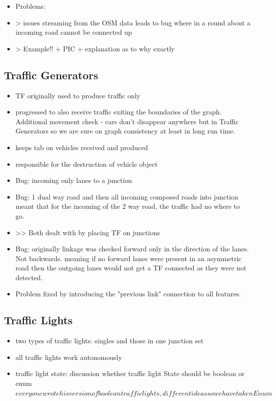 \begin{itemize}
	\item Problems:
	\item > issues streaming from the OSM data leads to bug where in a round about a incoming road cannot be connected up
	\item > Example!! + PIC + explanation as to why exactly
\end{itemize}

\subsection{Traffic Generators}
\begin{itemize}
	\item TF originally used to produce traffic only
	\item progressed to also receive traffic exiting the boundaries of the graph. Additional movement check - cars don't disappear anywhere but in Traffic Generators so we are sure on graph consistency at least in long run time.
	\item keeps tab on vehicles received and produced
	\item responsible for the destruction of vehicle object
	\item Bug: incoming only lanes to a junction
	\item Bug: 1 dual way road and then all incoming composed roads into junction meant that for the incoming of the 2 way road, the traffic had no where to go.
	\item >> Both dealt with by placing TF on junctions
	\item Bug: originally linkage was checked forward only in the direction of the lanes. Not backwards. meaning if no forward lanes were present in an asymmetric road then the outgoing lanes would not get a TF connected as they were not detected.
	\item Problem fixed by introducing the "previous link" connection to all features.
\end{itemize}


\subsection{Traffic Lights}
\begin{itemize}
    \item two types of traffic lights: singles and those in one junction set
    \item all traffic lights work autonomously
	\item traffic light state: discussion whether traffic light State should be boolean or enum \(everyone wrote his version of boolean traffic lights, different ideas so we have taken Enum\)
\end{itemize}

